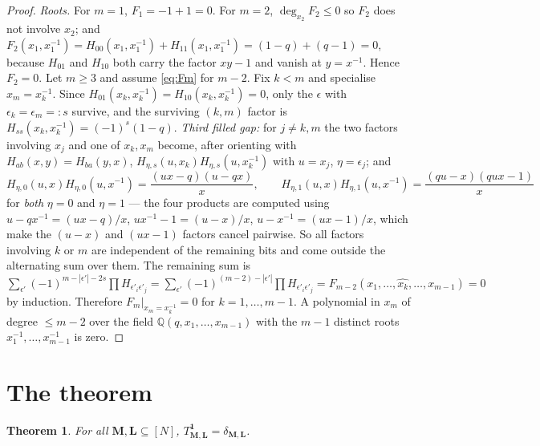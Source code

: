 \documentclass[11pt]{article}
\theoremstyle{plain}
\newtheorem{thm}{Theorem}
\theoremstyle{definition}
\theoremstyle{remark}
\newcommand{\bM}{\mathbf M}
\newcommand{\bL}{\mathbf L}
\begin{document}
\begin{proof}
\emph{Roots.} For $m=1$, $F_1=-1+1=0$. For $m=2$, $\deg_{x_2}F_2\le0$ so $F_2$ does
not involve $x_2$; and
$F_2(x_1,x_1^{-1})=H_{00}(x_1,x_1^{-1})+H_{11}(x_1,x_1^{-1})=(1-q)+(q-1)=0$,
because $H_{01}$ and $H_{10}$ both carry the factor $xy-1$ and vanish at
$y=x^{-1}$. Hence $F_2=0$. Let $m\ge3$ and assume \eqref{eq:Fm} for $m-2$. Fix
$k<m$ and specialise $x_m=x_k^{-1}$. Since
$H_{01}(x_k,x_k^{-1})=H_{10}(x_k,x_k^{-1})=0$, only the $\epsilon$ with
$\epsilon_k=\epsilon_m=:s$ survive, and the surviving $(k,m)$ factor is
$H_{ss}(x_k,x_k^{-1})=(-1)^s(1-q)$. \emph{Third filled gap:} for $j\ne k,m$ the two
factors involving $x_j$ and one of $x_k,x_m$ become, after orienting with
$H_{ab}(x,y)=H_{ba}(y,x)$, $H_{\eta,s}(u,x_k)H_{\eta,s}(u,x_k^{-1})$ with $u=x_j$,
$\eta=\epsilon_j$; and
\[
H_{\eta,0}(u,x)H_{\eta,0}(u,x^{-1})=\frac{(ux-q)(u-qx)}{x},\qquad
H_{\eta,1}(u,x)H_{\eta,1}(u,x^{-1})=\frac{(qu-x)(qux-1)}{x}
\]
for \emph{both} $\eta=0$ and $\eta=1$ --- the four products are computed using
$u-qx^{-1}=(ux-q)/x$, $ux^{-1}-1=(u-x)/x$, $u-x^{-1}=(ux-1)/x$, which make the
$(u-x)$ and $(ux-1)$ factors cancel pairwise. So all factors involving $k$ or $m$
are independent of the remaining bits and come outside the alternating sum over
them. The remaining sum is
$\sum_{\epsilon'}(-1)^{m-|\epsilon'|-2s}\prod H_{\epsilon'_i\epsilon'_j}
=\sum_{\epsilon'}(-1)^{(m-2)-|\epsilon'|}\prod H_{\epsilon'_i\epsilon'_j}
=F_{m-2}(x_1,\dots,\widehat{x_k},\dots,x_{m-1})=0$ by induction. Therefore
$F_m|_{x_m=x_k^{-1}}=0$ for $k=1,\dots,m-1$. A polynomial in $x_m$ of degree
$\le m-2$ over the field $\mathbb Q(q,x_1,\dots,x_{m-1})$ with the $m-1$ distinct
roots $x_1^{-1},\dots,x_{m-1}^{-1}$ is zero.
\end{proof}

\section{The theorem}
\label{sec:main}

\begin{thm}
\label{thm:main}
For all $\bM,\bL\subseteq[N]$, $T^{\mathbf 1}_{\bM,\bL}=\delta_{\bM,\bL}$.
\end{thm}
\end{document}

